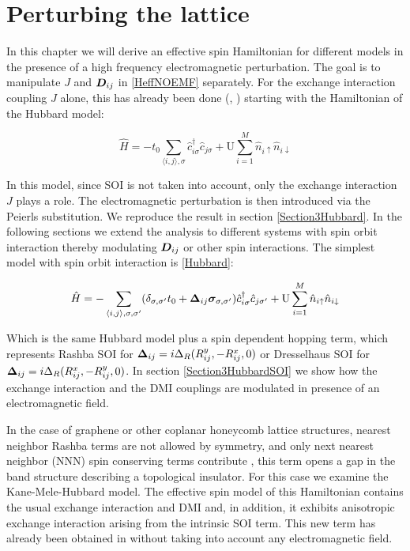 \chapter{Perturbing the lattice}
\label{ChapPerturbing}

In this chapter we will derive an effective spin Hamiltonian for different models in the presence of a high frequency electromagnetic perturbation. The goal is to manipulate $J$ and $\boldsymbol{D}_{ij}$ in \ref{HeffNOEMF} separately. For the exchange interaction coupling $J$ alone, this has already been done (\cite{Mentink2015}, \cite{Kitamura2017}) starting with the Hamiltonian of the Hubbard model:

\begin{equation*}
\hat{H} = -t_0\sum_{\langle i,j \rangle, \sigma} \hat{c}_{i \sigma}^\dagger \hat{c}_{j \sigma} + \text{U} \sum_{i=1}^M \hat{n}_{i\uparrow}\hat{n}_{i\downarrow}
\end{equation*} 

In this model, since SOI is not taken into account, only the exchange interaction $J$ plays a role. The electromagnetic perturbation is then introduced via the Peierls substitution. We reproduce the result in section \ref{Section3Hubbard}. In the following sections we extend the analysis to different systems with spin orbit interaction thereby modulating $\boldsymbol{D}_{ij}$ or other spin interactions. The simplest model with spin orbit interaction is \ref{Hubbard}:

\begin{equation*}
\hat{H} = -\sum_{\langle i,j \rangle, \sigma, \sigma'}(\delta_{\sigma, \sigma'} t_{0} + \boldsymbol{\Delta}_{ij} \boldsymbol{\sigma}_{\sigma, \sigma'})\hat{c}_{i \sigma}^\dagger \hat{c}_{j \sigma'} + \text{U} \sum_{i=1}^M \hat{n}_{i\uparrow}\hat{n}_{i\downarrow}
\end{equation*}

Which is the same Hubbard model plus a spin dependent hopping term, which represents Rashba SOI for $\boldsymbol{\Delta}_{ij} = i\Delta_R(R_{ij}^y, -R_{ij}^x, 0)$ or Dresselhaus SOI for $\boldsymbol{\Delta}_{ij} = i\Delta_R(R_{ij}^x, -R_{ij}^y, 0)$. In section \ref{Section3HubbardSOI} we show how the exchange interaction and the DMI couplings are modulated in presence of an electromagnetic field.  

In the case of graphene or other coplanar honeycomb lattice structures, nearest neighbor Rashba terms are not allowed by symmetry, and only next nearest neighbor (NNN) spin conserving terms contribute \cite{Kane2005}, this term opens a gap in the band structure describing a topological insulator. For this case we examine the Kane-Mele-Hubbard model. The effective spin model of this Hamiltonian contains the usual exchange interaction and DMI and, in addition, it exhibits anisotropic exchange interaction arising from the intrinsic SOI term. This new term has already been obtained in \cite{Rachel2010} without taking into account any electromagnetic field.

